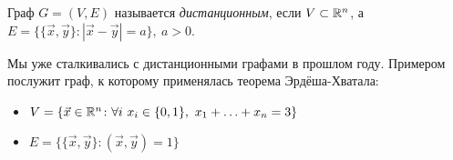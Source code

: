 \begin{definition}
	Граф $G = (V, E)$ называется \textit{дистанционным}, если $V \subset \mathbb{R}^n$, а $E = \{\{\vec{x}, \vec{y}\} \colon |\vec{x} - \vec{y}| = a\},\ a > 0$.
\end{definition}

\begin{example}
	Мы уже сталкивались с дистанционными графами в прошлом году. Примером послужит граф, к которому применялась теорема Эрдёша-Хватала: 
	\begin{itemize}
		\item \(V = \{\vec{x} \in \mathbb{R}^n \colon \forall i\ x_i \in \{0, 1\},\ x_1 + \ldots + x_n = 3\}\)
		
		\item \(E = \{\{\vec{x}, \vec{y}\} \colon (\vec{x}, \vec{y}) = 1\}\)
	\end{itemize}
\end{example}